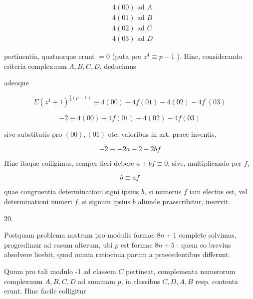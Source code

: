 \documentclass[10pt]{article}
\begin{document}
\[
\begin{aligned}
& 4(00) \text { ad } A \\
& 4(01) \text { ad } B \\
& 4(02) \text { ad } C \\
& 4(03) \text { ad } D
\end{aligned}
\]

pertinentia, quatuorque erunt \(=0\) (puta pro \(z^{4} \equiv p-1\) ). Hinc, considerando criteria complexuum \(A, B, C, D\), deducimus

adeoque

\[
\Sigma\left(z^{4}+1\right)^{\frac{1}{2}(p-1)} \equiv 4(00)+4 f(01)-4(02)-4 f^{\prime}(03)
\]

\[
-2 \equiv 4(00)+4 f(01)-4(02)-4 f(03)
\]

sive substitutis pro \((00),(01)\) etc. valoribus in art. praec inventis,

\[
-2 \equiv-2 a-2-2 b f
\]

Hinc itaque colligimus, semper fieri debere \(a+b f \equiv 0\), sive, multiplicando per \(f\),

\[
b \equiv a f
\]

quae congruentia determinationi signi ipsius \(b\), si numerus \(f\) iam electus est, vel determinationi numeri \(f\), si signum ipsius \(b\) aliunde praescribitur, inservit.

20.

Postquam problema nostrum pro modulis formae \(8 n+1\) complete solvimus, progredimur ad casum alterum, ubi \(p\) est formae \(8 n+5\) : quem eo brevius absolvere licebit, quod omnia ratiocinia parum a praecedentibus differunt.

Quum pro tali modulo -1 ad classem \(C\) pertineat, complementa numerorum complexuum \(A, B, C, D\) ad summam \(p\), in classibus \(C, D, A, B\) resp. contenta erunt. Hinc facile colligitur
\end{document}
